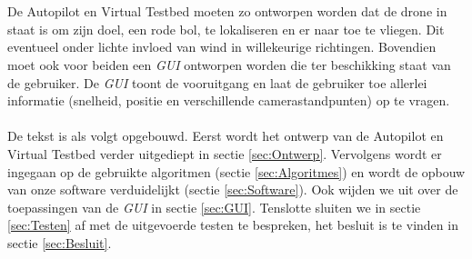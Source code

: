 \\
\\
De Autopilot en Virtual Testbed moeten zo ontworpen worden dat de drone in staat is om zijn doel, een rode bol, te lokaliseren en er naar toe te vliegen. Dit eventueel onder lichte invloed van wind in willekeurige richtingen. Bovendien moet ook voor beiden een \textit{GUI} ontworpen worden die ter beschikking staat van de gebruiker. De \textit{GUI} toont de vooruitgang en laat de gebruiker toe allerlei informatie (snelheid, positie en verschillende camerastandpunten) op te vragen.
\\
\\
De tekst is als volgt opgebouwd. Eerst wordt het ontwerp van de Autopilot en Virtual Testbed verder uitgediept in sectie \ref{sec:Ontwerp}. Vervolgens wordt er ingegaan op de gebruikte algoritmen (sectie \ref{sec:Algoritmes}) en wordt de opbouw van onze software verduidelijkt (sectie \ref{sec:Software}). Ook wijden we uit over de toepassingen van de \textit{GUI} in sectie \ref{sec:GUI}. Tenslotte sluiten we in sectie \ref{sec:Testen} af met de uitgevoerde testen te bespreken, het besluit is te vinden in sectie \ref{sec:Besluit}. \\